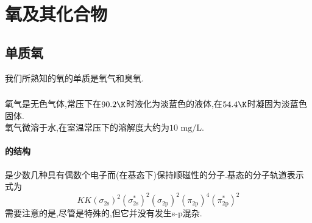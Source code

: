 \documentclass{ctexart}
\begin{document}
\section{氧及其化合物}
\subsection{单质氧}
我们所熟知的氧的单质是氧气和臭氧.
\subsubsection{}
\begin{substance}[\ce{O2}]
    氧气是无色气体,常压下在$90.2\K$时液化为淡蓝色的液体,在$54.4\K$时凝固为淡蓝色固体.\\
    氧气微溶于水,在室温常压下的溶解度大约为$10\text{ mg/L}$.
\end{substance}
\paragraph{的结构}
是少数几种具有偶数个电子而(在基态下)保持顺磁性的分子.基态的分子轨道表示式为
\[KK\left(\sigma_{2\text{s}}\right)^2\left(\sigma_{2\text{s}}^\ast\right)^2\left(\sigma_{2\text{p}}\right)^2\left(\pi_{2\text{p}}\right)^4\left(\pi_{2\text{p}}^\ast\right)^2\]
需要注意的是,尽管是特殊的,但它并没有发生s-p混杂.
\end{document}
